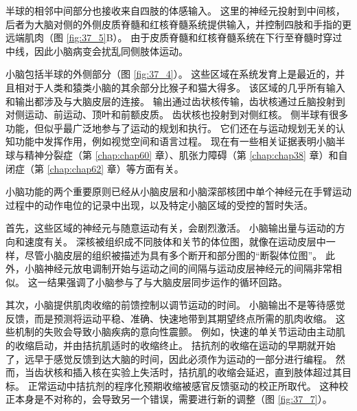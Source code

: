 半球的相邻中间部分也接收来自四肢的体感输入。
这里的神经元投射到中间核，后者为大脑对侧的外侧皮质脊髓和红核脊髓系统提供输入，并控制四肢和手指的更远端肌肉（图 \ref{fig:37_5}B）。
由于皮质脊髓和红核脊髓系统在下行至脊髓时穿过中线，因此小脑病变会扰乱同侧肢体运动。


小脑包括半球的外侧部分（图 \ref{fig:37_4}）。 这些区域在系统发育上是最近的，并且相对于人类和猿类小脑的其余部分比猴子和猫大得多。
该区域的几乎所有输入和输出都涉及与大脑皮层的连接。
输出通过齿状核传输，齿状核通过丘脑投射到对侧运动、前运动、顶叶和前额皮质。
齿状核也投射到对侧红核。
侧半球有很多功能，但似乎最广泛地参与了运动的规划和执行。
它们还在与运动规划无关的认知功能中发挥作用，例如视觉空间和语言过程。
现在有一些相关证据表明小脑半球与精神分裂症（第 \ref{chap:chap60} 章）、肌张力障碍（第 \ref{chap:chap38} 章）和自闭症（第 \ref{chap:chap62} 章）等方面有关。


小脑功能的两个重要原则已经从小脑皮层和小脑深部核团中单个神经元在手臂运动过程中的动作电位的记录中出现，以及特定小脑区域的受控的暂时失活。


首先，这些区域的神经元与随意运动有关，会剧烈激活。
小脑输出量与运动的方向和速度有关。
深核被组织成不同肢体和关节的体位图，就像在运动皮层中一样，尽管小脑皮层的组织被描述为具有多个断开和部分图的“断裂体位图”。
此外，小脑神经元放电调制开始与运动之间的间隔与运动皮层神经元的间隔非常相似。
这一结果强调了小脑参与了与大脑皮层同步运作的循环回路。


其次，小脑提供肌肉收缩的前馈控制以调节运动的时间。
小脑输出不是等待感觉反馈，而是预测将运动平稳、准确、快速地带到其期望终点所需的肌肉收缩。
这些机制的失败会导致小脑疾病的意向性震颤。
例如，快速的单关节运动由主动肌的收缩启动，并由拮抗肌适时的收缩终止。
拮抗剂的收缩在运动的早期就开始了，远早于感觉反馈到达大脑的时间，因此必须作为运动的一部分进行编程。
然而，当齿状核和插入核在实验上失活时，拮抗肌的收缩会延迟，直到肢体超过其目标。
正常运动中拮抗剂的程序化预期收缩被感官反馈驱动的校正所取代。
这种校正本身是不对称的，会导致另一个错误，需要进行新的调整（图 \ref{fig:37_7}）。


